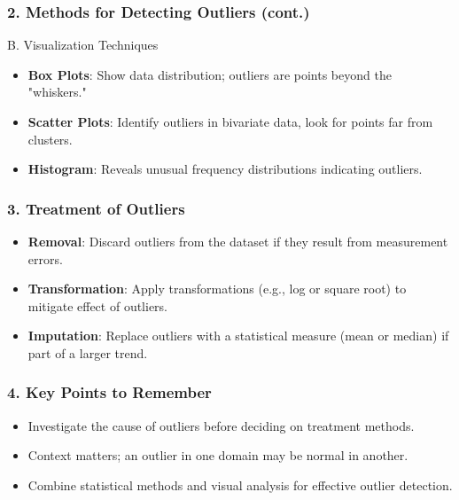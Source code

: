 \documentclass[aspectratio=169]{beamer}
\begin{document}
\begin{frame}
    \frametitle{2. Methods for Detecting Outliers (cont.)}
    \begin{block}{B. Visualization Techniques}
        \begin{itemize}
            \item \textbf{Box Plots}: Show data distribution; outliers are points beyond the "whiskers."
            \item \textbf{Scatter Plots}: Identify outliers in bivariate data, look for points far from clusters.
            \item \textbf{Histogram}: Reveals unusual frequency distributions indicating outliers.
        \end{itemize}
    \end{block}
\end{frame}

\begin{frame}
    \frametitle{3. Treatment of Outliers}
    \begin{itemize}
        \item \textbf{Removal}: Discard outliers from the dataset if they result from measurement errors.
        \item \textbf{Transformation}: Apply transformations (e.g., log or square root) to mitigate effect of outliers.
        \item \textbf{Imputation}: Replace outliers with a statistical measure (mean or median) if part of a larger trend.
    \end{itemize}
\end{frame}

\begin{frame}[fragile]
    \frametitle{4. Key Points to Remember}
    \begin{itemize}
        \item Investigate the cause of outliers before deciding on treatment methods.
        \item Context matters; an outlier in one domain may be normal in another.
        \item Combine statistical methods and visual analysis for effective outlier detection.
    \end{itemize}
\end{frame}
\end{document}
